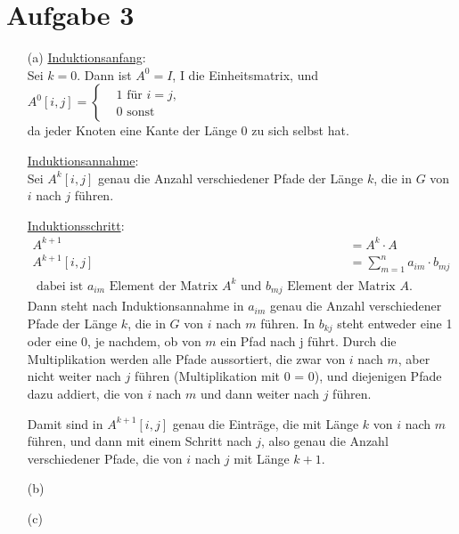\documentclass{scrartcl}
\begin{document}
 

\section{Aufgabe 3}

\begin{enumerate} 
\item[(a)] 
\underline{Induktionsanfang}: \\
Sei $k=0$. Dann ist $A^0=I$, I die Einheitsmatrix, und \\
$A^0[i,j]= \begin{cases} &1 \text{ für } i=j, \\
			&0 \text{ sonst } \end{cases}$ \\ 
da jeder Knoten eine Kante der Länge 0 zu sich selbst hat.

\underline{Induktionsannahme}: \\
Sei $A^k[i,j]$ genau die Anzahl verschiedener Pfade der Länge $k$, 
die in $G$ von $i$ nach $j$ führen. 

\underline{Induktionsschritt}: \\
\begin{align*} 
A^{k+1}&=A^k \cdot A \\ 
A^{k+1}[i,j]&= \sum_{m=1}^n a_{im} \cdot b_{mj} \\
\text{ dabei ist } a_{im} \text{ Element der Matrix } A^k 
\text{ und } b_{mj} \text{ Element der Matrix } A. 
\end{align*} 
Dann steht nach Induktionsannahme in $a_{im}$ genau die Anzahl 
verschiedener Pfade der Länge $k$, die in $G$ von $i$ nach $m$ führen.
In $b_{kj}$ steht entweder eine 1 oder eine 0, je nachdem, ob von $m$ ein 
Pfad nach j führt. Durch die Multiplikation werden alle Pfade 
aussortiert, die zwar von $i$ nach $m$, aber nicht weiter nach $j$ führen 
(Multiplikation mit 0 = 0), und diejenigen Pfade dazu addiert, die von 
$i$ nach $m$ und dann weiter nach $j$ führen. 

Damit sind in $A^{k+1}[i,j]$ genau die Einträge, die mit Länge $k$ von 
$i$ nach $m$ führen, und dann mit einem Schritt nach $j$, also genau 
die Anzahl verschiedener Pfade, die von $i$ nach $j$ mit Länge $k+1$.


\item[(b)] \item[(c)] \end{enumerate}
\end{document}

